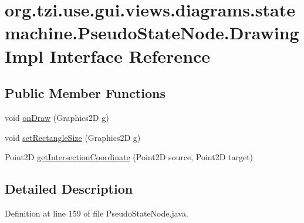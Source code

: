 \hypertarget{interfaceorg_1_1tzi_1_1use_1_1gui_1_1views_1_1diagrams_1_1statemachine_1_1_pseudo_state_node_1_1_drawing_impl}{\section{org.\-tzi.\-use.\-gui.\-views.\-diagrams.\-statemachine.\-Pseudo\-State\-Node.\-Drawing\-Impl Interface Reference}
\label{interfaceorg_1_1tzi_1_1use_1_1gui_1_1views_1_1diagrams_1_1statemachine_1_1_pseudo_state_node_1_1_drawing_impl}
}
\subsection*{Public Member Functions}
\begin{DoxyCompactItemize}
\item 
void \hyperlink{interfaceorg_1_1tzi_1_1use_1_1gui_1_1views_1_1diagrams_1_1statemachine_1_1_pseudo_state_node_1_1_drawing_impl_a088580a9de7be8bc68367af2f62dc08b}{on\-Draw} (Graphics2\-D g)
\item 
void \hyperlink{interfaceorg_1_1tzi_1_1use_1_1gui_1_1views_1_1diagrams_1_1statemachine_1_1_pseudo_state_node_1_1_drawing_impl_adb32a3cf47c3644b560bfd16d9a1815d}{set\-Rectangle\-Size} (Graphics2\-D g)
\item 
Point2\-D \hyperlink{interfaceorg_1_1tzi_1_1use_1_1gui_1_1views_1_1diagrams_1_1statemachine_1_1_pseudo_state_node_1_1_drawing_impl_a1ca89c92f719d85ee715135b037e6c1f}{get\-Intersection\-Coordinate} (Point2\-D source, Point2\-D target)
\end{DoxyCompactItemize}


\subsection{Detailed Description}


Definition at line 159 of file Pseudo\-State\-Node.\-java.



